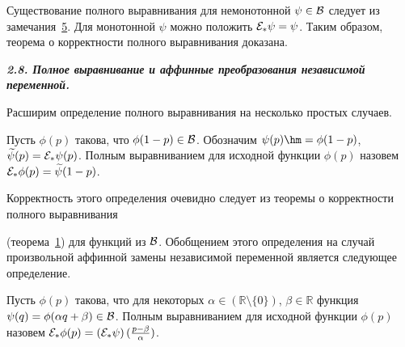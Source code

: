 \smallskip



\hypertarget{palin:remark6}{}



\begin{remark}[6] Существование полного выравнивания для немонотонной $\psi\in{\cal B}$ следует из замечания~\hyperlink{palin:remark5}{5}. Для монотонной $\psi$ можно положить ${\cal E}_*\psi=\psi$. Таким образом, теорема о корректности полного выравнивания доказана.

\end{remark}



\smallskip



{\bf \itshape 2.8. Полное выравнивание и аффинные преобразования независимой переменной.}

Расширим определение полного выравнивания на несколько простых случаев. 



\hypertarget{palin:definition7}{}



\begin{definition}[7]Пусть $\phi(p)$ такова, что $\phi(1-p)\in{\cal B}$. Обозначим $\psi(p)\hm =\phi(1-p)$, $\widetilde{\psi}(p)={\cal E}_*\psi(p)$. Полным выравниванием для исходной функции $\phi(p)$ назовем ${\cal E}_*\phi(p)=\widetilde{\psi}(1-p)$.

\end{definition}



\smallskip



Корректность этого определения очевидно следует из теоремы о корректности полного выравнивания 

(теорема~\hyperlink{newth}{1}) для функций из ${\cal B}$. Обобщением этого определения на случай произвольной аффинной замены независимой переменной является следующее определение.



\smallskip



\hypertarget{palin:definition8}{}



\begin{definition}[8]

Пусть $\phi(p)$ такова, что для некоторых $\alpha\in(\mathbb{R}\setminus\{0\})$, $\beta\in\mathbb{R}$ функция $\psi(q)=\phi(\alpha q+\beta)\in{\cal B}$. Полным выравниванием для исходной функции $\phi(p)$ назовем ${\cal E}_*\phi(p)=\left({\cal E}_*\psi\right)(\frac{p-\beta}{\alpha})$.

\end{definition}



